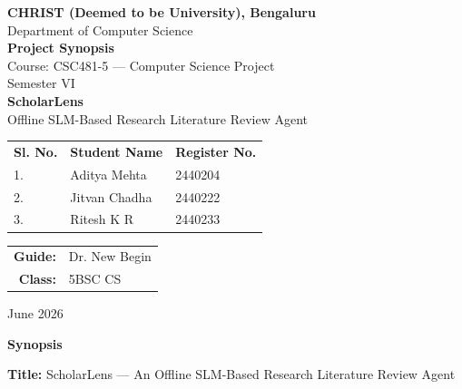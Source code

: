 \documentclass[12pt,a4paper]{article}
\begin{document}
\begin{titlepage}
    \centering
    \vspace*{0.5cm}

    {\large\bfseries CHRIST (Deemed to be University), Bengaluru}\\[4pt]
    {\normalsize Department of Computer Science}\\[1.5cm]

    {\LARGE\bfseries Project Synopsis}\\[0.4cm]
    {\large Course: CSC481-5 --- Computer Science Project}\\[0.3cm]
    {\large Semester VI}\\[2cm]

    {\huge\bfseries ScholarLens}\\[0.3cm]
    {\Large Offline SLM-Based Research Literature Review Agent}\\[2.5cm]

    \begin{tabular}{l l l}
        \textbf{Sl. No.} & \textbf{Student Name} & \textbf{Register No.} \\[6pt]
        1. & Aditya Mehta   & 2440204 \\[4pt]
        2. & Jitvan Chadha  & 2440222 \\[4pt]
        3. & Ritesh K R     & 2440233 \\[4pt]
    \end{tabular}

    \vspace{2cm}

    \begin{tabular}{>{\bfseries}r l}
        Guide: & Dr. New Begin \\[4pt]
        Class: & 5BSC CS \\[4pt]
    \end{tabular}

    \vfill
    {\large June 2026}
\end{titlepage}


\begin{center}
    {\Large\bfseries Synopsis}
\end{center}

\vspace{0.3cm}

\textbf{Title:} ScholarLens --- An Offline SLM-Based Research Literature
Review Agent
\end{document}
